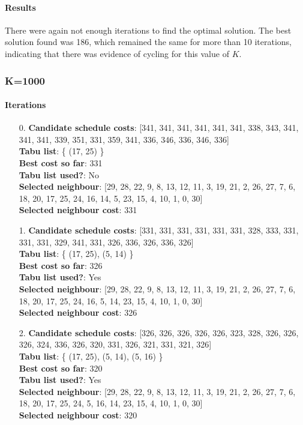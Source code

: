 \documentclass[fleqn]{article}
\begin{document}
  \paragraph{Results}
  There were again not enough iterations to find the optimal solution. The best solution found was 186, which remained the same for more than 10 iterations, indicating that there was evidence of cycling for this value of $K$.

  \subsubsection{K=1000}
  \paragraph{Iterations}
  \begin{itemize}

    \item[0.] \textbf{Candidate schedule costs}: [341, 341, 341, 341, 341, 341, 338, 343, 341, 341, 341, 339, 351, 331, 359, 341, 336, 346, 336, 346, 336] \\
    \textbf{Tabu list}: \{ (17, 25) \} \\
    \textbf{Best cost so far}: 331 \\
    \textbf{Tabu list used?}: No \\
    \textbf{Selected neighbour}: [29, 28, 22, 9, 8, 13, 12, 11, 3, 19, 21, 2, 26, 27, 7, 6, 18, 20, 17, 25, 24, 16, 14, 5, 23, 15, 4, 10, 1, 0, 30] \\
    \textbf{Selected neighbour cost}: 331
      

    \item[1.] \textbf{Candidate schedule costs}: [331, 331, 331, 331, 331, 331, 328, 333, 331, 331, 331, 329, 341, 331, 326, 336, 326, 336, 326] \\
    \textbf{Tabu list}: \{ (17, 25), (5, 14) \} \\
    \textbf{Best cost so far}: 326 \\
    \textbf{Tabu list used?}: Yes \\
    \textbf{Selected neighbour}: [29, 28, 22, 9, 8, 13, 12, 11, 3, 19, 21, 2, 26, 27, 7, 6, 18, 20, 17, 25, 24, 16, 5, 14, 23, 15, 4, 10, 1, 0, 30] \\
    \textbf{Selected neighbour cost}: 326
      

    \item[2.] \textbf{Candidate schedule costs}: [326, 326, 326, 326, 326, 323, 328, 326, 326, 326, 324, 336, 326, 320, 331, 326, 321, 331, 321, 326] \\
    \textbf{Tabu list}: \{ (17, 25), (5, 14), (5, 16) \} \\
    \textbf{Best cost so far}: 320 \\
    \textbf{Tabu list used?}: Yes \\
    \textbf{Selected neighbour}: [29, 28, 22, 9, 8, 13, 12, 11, 3, 19, 21, 2, 26, 27, 7, 6, 18, 20, 17, 25, 24, 5, 16, 14, 23, 15, 4, 10, 1, 0, 30] \\
    \textbf{Selected neighbour cost}: 320
      


\end{itemize}
\end{document}
